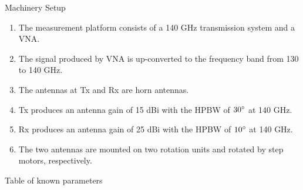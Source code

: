 \documentclass{beamer}
\begin{document}
\begin{frame}{Machinery Setup}
\begin{enumerate}
    \item The measurement platform consists of a 140 GHz transmission system and a VNA.
    \item The signal produced by VNA is up-converted to the frequency band from 130 to 140 GHz.
    \item The antennas at Tx and Rx are horn antennas.
    \item Tx produces an antenna gain of 15 dBi with the HPBW of $30\degree$ at 140 GHz.
    \item Rx produces an antenna gain of 25 dBi with the HPBW of $10\degree$ at 140 GHz.
    \item The two antennas are mounted on two rotation units and rotated by step motors, respectively.
\end{enumerate}
\end{frame}
\begin{frame}{Table of known parameters}
\begin{center}
\begin{table}[h]
    \centering
    \caption{Known measurement parameters}
    \label{table 1}
\end{table}
\end{center}
\end{frame}
\end{document}
